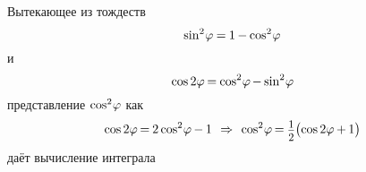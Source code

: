 \documentclass[14pt]{extarticle}
\newcommand\cosine{\operatorname{cos}}
\newcommand\sine{\operatorname{sin}}
\begin{document}
Вытекающее из тождеств
\nopagebreak\vspace{-.5em}\[
\sine^{2} \hspace{-.33ex} \varphi \hspace{-.1ex} = \hspace{-.1ex} 1 \hspace{-.1ex} - \hspace{-.1ex} \cosine^{2} \hspace{-.33ex} \varphi
\vspace{-1.5em}\]
и
\nopagebreak\vspace{-.5em}\[
\cosine 2\varphi \hspace{-.2ex} = \hspace{-.1ex} \cosine^{2} \hspace{-.33ex} \varphi \hspace{-.2ex} - \hspace{-.1ex} \sine^{2} \hspace{-.33ex} \varphi
\]
представление ${\cosine^{2} \hspace{-.33ex} \varphi}$ как
\[
\cosine 2\varphi \hspace{-.2ex} = \hspace{-.15ex} 2 \cosine^{2} \hspace{-.33ex} \varphi \hspace{-.1ex} - \hspace{-.1ex} 1
\hspace{.4em}\Rightarrow\hspace{.4em}
\cosine^{2} \hspace{-.33ex} \varphi \hspace{-.2ex}
= \hspace{-.1ex} \scalebox{.88}{$ \displaystyle\frac{\raisebox{-.2em}{$1$}}{2} $} \bigl( \cosine 2\varphi \hspace{-.1ex} + \hspace{-.1ex} 1 \bigr)
\]
даёт вычисление интеграла
\end{document}
